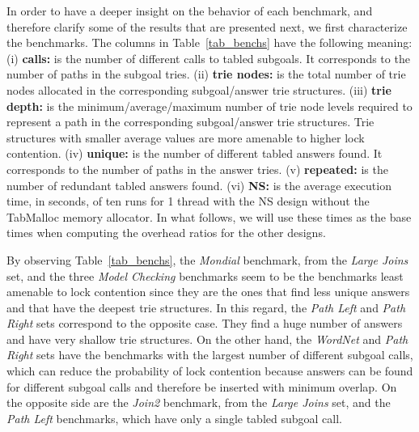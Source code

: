 \documentclass{llncs}
\begin{document}
In order to have a deeper insight on the behavior of each benchmark,
and therefore clarify some of the results that are presented next, we
first characterize the benchmarks. The columns in
Table~\ref{tab_benchs} have the following meaning: (i) {\bf calls:} is
the number of different calls to tabled subgoals. It corresponds to
the number of paths in the subgoal tries. (ii) {\bf trie nodes:} is
the total number of trie nodes allocated in the corresponding
subgoal/answer trie structures. (iii) {\bf trie depth:} is the
minimum/average/maximum number of trie node levels required to
represent a path in the corresponding subgoal/answer trie
structures. Trie structures with smaller average values are more
amenable to higher lock contention. (iv) {\bf unique:} is the number
of different tabled answers found. It corresponds to the number of
paths in the answer tries. (v) {\bf repeated:} is the number of
redundant tabled answers found. (vi) {\bf NS:} is the average
execution time, in seconds, of ten runs for 1 thread with the NS
design without the TabMalloc memory allocator. In what follows, we
will use these times as the base times when computing the overhead
ratios for the other designs.

By observing Table~\ref{tab_benchs}, the \emph{Mondial} benchmark,
from the \emph{Large Joins} set, and the three \emph{Model
  Checking} benchmarks seem to be the benchmarks least amenable to
lock contention since they are the ones that find less unique answers
and that have the deepest trie structures. In this regard, the
\emph{Path Left} and \emph{Path Right} sets correspond to the
opposite case. They find a huge number of answers and have very
shallow trie structures. On the other hand, the \emph{WordNet} and
\emph{Path Right} sets have the benchmarks with the largest number
of different subgoal calls, which can reduce the probability of lock
contention because answers can be found for different subgoal calls
and therefore be inserted with minimum overlap. On the opposite side
are the \emph{Join2} benchmark, from the \emph{Large Joins} set,
and the \emph{Path Left} benchmarks, which have only a single tabled
subgoal call.
\end{document}
